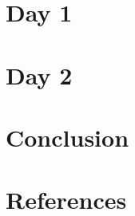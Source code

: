\documentclass{article}
\title{}
\author{}
\date{May 2025}
\begin{document}


\newpage
\tableofcontents
\newpage




\section{Day 1}


\section{Day 2}


\section{Conclusion}


\section{References}
\begingroup
\renewcommand{\section}[2]{}


\endgroup
\end{document}
